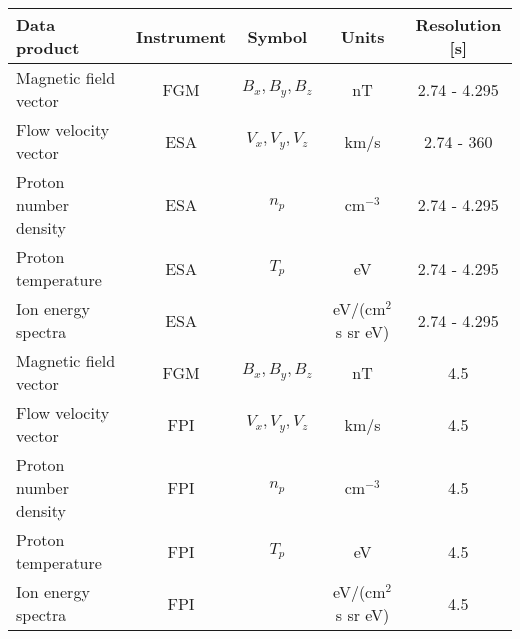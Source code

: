 \begin{tabular}{lcccc}
\hline
Data product          & Instrument & Symbol           & Units        & Resolution [s] \\
\hline
Magnetic field vector & FGM        & $B_x, B_y, B_z$  & nT                   & 2.74 - 4.295 \\
Flow velocity vector  & ESA        & $V_x, V_y, V_z$  & km/s                 & 2.74 - 360 \\
Proton number density & ESA        & $n_p$            & cm$^{-3}$            & 2.74 - 4.295 \\
Proton temperature    & ESA        & $T_p$            & eV                   & 2.74 - 4.295 \\
Ion energy spectra    & ESA        &                  & eV/(cm$^2$ s sr eV)  & 2.74 - 4.295 \\
\hline
Magnetic field vector & FGM        & $B_x, B_y, B_z$  & nT                   & 4.5 \\
Flow velocity vector  & FPI        & $V_x, V_y, V_z$  & km/s                 & 4.5 \\
Proton number density & FPI        & $n_p$            & cm$^{-3}$            & 4.5 \\
Proton temperature    & FPI        & $T_p$            & eV                   & 4.5 \\
Ion energy spectra    & FPI        &                  & eV/(cm$^2$ s sr eV)  & 4.5 \\
\hline
\end{tabular}